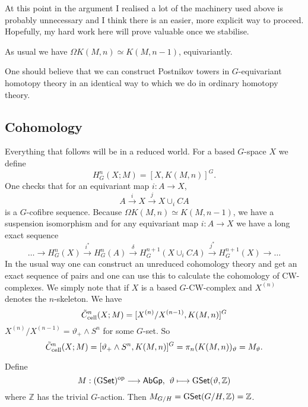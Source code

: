 \documentclass[11pt]{article}
\begin{document}
\begin{SecondWeek}
At this point in the argument I realised a lot of the machinery used above is probably unnecessary and I think there is an easier, more explicit way to proceed. Hopefully, my hard work here will prove valuable once we stabilise.

As usual we have $\Omega K(M,n)\simeq K(M,n-1)$, equivariantly.

One should believe that we can construct Postnikov towers in $G$-equivariant homotopy theory in an identical way to which we do in ordinary homotopy theory.







\subsection*{Cohomology}
Everything that follows will be in a reduced world. For a based $G$-space $X$ we define
\[H^n_G(X;M)=[X,K(M,n)]^G.\]
One checks that for an equivariant map $i:A\to X$,
\[A\overset{i}{\to}X\overset{j}{\to}X\cup_i CA\]
is a $G$-cofibre sequence. Because $\Omega K(M,n)\simeq K(M,n-1)$, we have a suspension isomorphism and for any equivariant map $i:A\to X$ we have a long exact sequence
\[\ldots\to H^n_G(X)\overset{i^*}{\to}H^n_G(A)\overset{\delta}{\to}
H^{n+1}_G(X\cup_i CA)\overset{j^*}{\to} H^{n+1}_G(X)\to\ldots\]
In the usual way one can construct an unreduced cohomology theory and get an exact sequence of pairs and one can use this to calculate the cohomology of CW-complexes. We simply note that if $X$ is a based $G$-CW-complex and $X^{(n)}$ denotes the $n$-skeleton. We have
\[\tilde{C}^n_{\textup{cell}}(X;M)=[X^{(n)}/X^{(n-1)},K(M,n)]^G\]
$X^{(n)}/X^{(n-1)}=\vartheta_+\wedge S^n$ for some $G$-set. So
\[\tilde{C}^n_{\textup{cell}}(X;M)=[\vartheta_+\wedge S^n,K(M,n)]^G=\pi_n(K(M,n))_{\vartheta}=M_{\vartheta}.\]
\begin{exmp*}
Define
\[M:(\operatorname{{G\mathsf{Set}}})^{\textup{op}}\longrightarrow\operatorname{{\mathsf{AbGp}}},
\hspace{4pt}
\vartheta\longmapsto \operatorname{{G\mathsf{Set}}}(\vartheta,\mathbb{Z})\]
where $\mathbb{Z}$ has the trivial $G$-action. Then $M_{G/H}=
\operatorname{{G\mathsf{Set}}}(G/H,\mathbb{Z})=\mathbb{Z}$.


\end{exmp*}
\end{SecondWeek}
\end{document}
